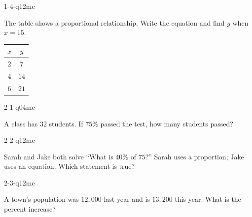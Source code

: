 
\begin{practiceQuestion}{1-4-q12}{mc}
\begin{questionText}
The table shows a proportional relationship. Write the equation and find $y$ when $x = 15$.

\begin{center}
\begin{tabular}{|c|c|}
\hline $x$ & $y$ \\ \hline $2$ & $7$ \\ $4$ & $14$ \\ $6$ & $21$ \\ \hline
\end{tabular}
\end{center}
\end{questionText}
\end{practiceQuestion}

\begin{practiceQuestion}{2-1-q04}{mc}
\begin{questionText}
A class has $32$ students. If $75\%$ passed the test, how many students passed?
\end{questionText}
\end{practiceQuestion}

\begin{practiceQuestion}{2-2-q12}{mc}
\begin{questionText}
Sarah and Jake both solve ``What is $40\%$ of $75$?'' Sarah uses a proportion; Jake uses an equation. Which statement is true?
\end{questionText}
\end{practiceQuestion}

\begin{practiceQuestion}{2-3-q12}{mc}
\begin{questionText}
A town's population was $12{,}000$ last year and is $13{,}200$ this year. What is the percent increase?
\end{questionText}
\end{practiceQuestion}

